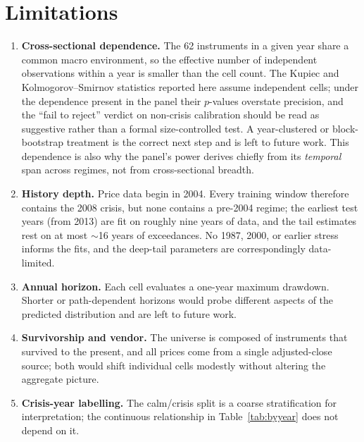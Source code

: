 \documentclass[11pt]{article}
\begin{document}
\section{Limitations}
\label{sec:limits}
\begin{enumerate}[leftmargin=1.6em, itemsep=2pt]
  \item \textbf{Cross-sectional dependence.} The 62 instruments in a given year
  share a common macro environment, so the effective number of independent
  observations within a year is smaller than the cell count. The Kupiec and
  Kolmogorov--Smirnov statistics reported here assume independent cells; under the
  dependence present in the panel their $p$-values overstate precision, and the
  ``fail to reject'' verdict on non-crisis calibration should be read as
  suggestive rather than a formal size-controlled test. A year-clustered or
  block-bootstrap treatment is the correct next step and is left to future work.
  This dependence is also why the panel's power derives chiefly from its
  \emph{temporal} span across regimes, not from cross-sectional breadth.
  \item \textbf{History depth.} Price data begin in 2004. Every training window
  therefore contains the 2008 crisis, but none contains a pre-2004 regime; the
  earliest test years (from 2013) are fit on roughly nine years of data, and the
  tail estimates rest on at most $\sim$16 years of exceedances. No 1987, 2000, or
  earlier stress informs the fits, and the deep-tail parameters are correspondingly
  data-limited.
  \item \textbf{Annual horizon.} Each cell evaluates a one-year maximum drawdown.
  Shorter or path-dependent horizons would probe different aspects of the predicted
  distribution and are left to future work.
  \item \textbf{Survivorship and vendor.} The universe is composed of instruments
  that survived to the present, and all prices come from a single adjusted-close
  source; both would shift individual cells modestly without altering the aggregate
  picture.
  \item \textbf{Crisis-year labelling.} The calm/crisis split is a coarse
  stratification for interpretation; the continuous relationship in
  Table~\ref{tab:byyear} does not depend on it.
\end{enumerate}

\end{document}
